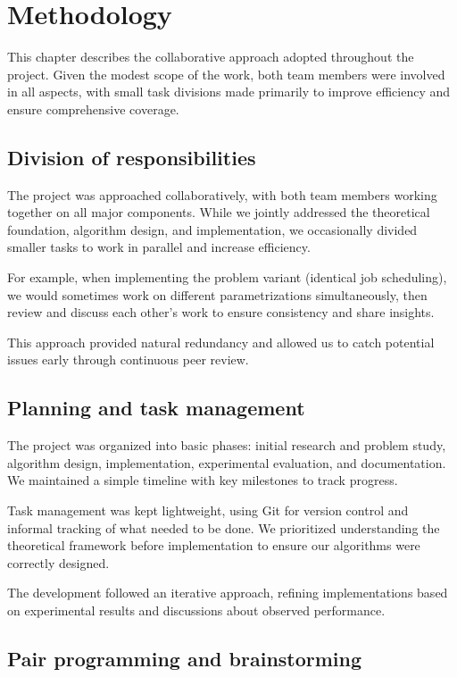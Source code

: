 \chapter{Methodology}

This chapter describes the collaborative approach adopted throughout the project.
Given the modest scope of the work, both team members were involved in all aspects, with small task divisions made primarily to improve efficiency and ensure comprehensive coverage.

\section{Division of responsibilities}

The project was approached collaboratively, with both team members working together on all major components.
While we jointly addressed the theoretical foundation, algorithm design, and implementation, we occasionally divided smaller tasks to work in parallel and increase efficiency.

For example, when implementing the problem variant (identical job scheduling), we would sometimes work on different parametrizations simultaneously, then review and discuss each other's work to ensure consistency and share insights.

This approach provided natural redundancy and allowed us to catch potential issues early through continuous peer review.

\section{Planning and task management}

The project was organized into basic phases: initial research and problem study, algorithm design, implementation, experimental evaluation, and documentation.
We maintained a simple timeline with key milestones to track progress.

Task management was kept lightweight, using Git for version control and informal tracking of what needed to be done.
We prioritized understanding the theoretical framework before implementation to ensure our algorithms were correctly designed.

The development followed an iterative approach, refining implementations based on experimental results and discussions about observed performance.

\section{Pair programming and brainstorming}

